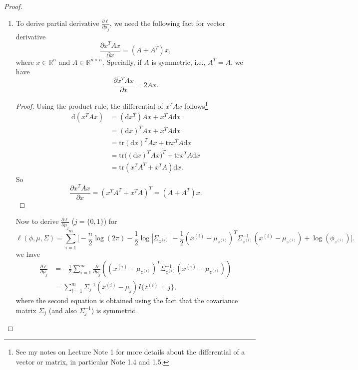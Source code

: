 \documentclass{article}
\begin{document}
\begin{proof}
\begin{enumerate}
            \item To derive partial derivative $\frac{\partial{\ell}}{\partial{\mu_j}}$, we need the following fact for vector derivative
                \[
                \frac{\partial{x^TAx}}{\partial{x}}=(A+A^T)x,
                \]
                where $x\in\mathbb{R}^n$ and $A\in{\mathbb{R}^{n\times{n}}}$. Specially, if $A$ is symmetric, i.e., $A^T=A$, we have
                \[\frac{\partial{x^TAx}}{\partial{x}}=2Ax.
                \]
                \begin{proof}
                Using the product rule, the differential of $x^TAx$ follows\footnote{See my notes on Lecture Note 1 for more details about the differential of a vector or matrix, in particular Note 1.4 and 1.5.}
                \[
                \begin{split}
                \text{d}(x^TAx)
                &=(\text{d}x^T)Ax+x^TA\text{d}x\\
                &=(\text{d}x)^TAx+x^TA\text{d}x\\
                &=\text{tr}(\text{d}x)^TAx+\text{tr}x^TA\text{d}x\\
                &=\text{tr}\big((\text{d}x)^TAx\big)^T+\text{tr}x^TA\text{d}x\\
                &=\text{tr}(x^TA^T+x^TA)\text{d}x.
                \end{split}
                \]
                So
                \[
                \frac{\partial{x^TAx}}{\partial{x}}=(x^TA^T+x^TA)^T=(A+A^T)x.
                \]
                \end{proof}
                Now to derive $\frac{\partial{\ell}}{\partial{\mu_j}}$ ($j=\{0,1\}$) for
                \[
                \ell(\phi,\mu,\Sigma)=\sum_{i=1}^m\Bigg[-\frac{n}{2}\log(2\pi)-\frac{1}{2}\log|\Sigma_{z^{(i)}}|%
                -\frac{1}{2}(x^{(i)}-\mu_{z^{(i)}})^T\Sigma_{z^{(i)}}^{-1}(x^{(i)}-\mu_{z^{(i)}})%
                +\log(\phi_{z^{(i)}})\Bigg].
                \]
                we have
                \[
                \begin{split}
                \frac{\partial{\ell}}{\partial{\mu_j}}
                &=-\frac{1}{2}\sum_{i=1}^m%
                \frac{\partial}{\partial{\mu_j}}\left((x^{(i)}-\mu_{z^{(i)}})^T\Sigma_{z^{(i)}}^{-1}(x^{(i)}-\mu_{z^{(i)}})\right)\\
                &=\sum_{i=1}^m \Sigma_j^{-1}(x^{(i)}-\mu_j)I\{z^{(i)}=j\},
                \end{split}
                \]
                where the second equation is obtained using the fact that the covariance matrix $\Sigma_j$ (and also $\Sigma_j^{-1}$) is symmetric.


\end{enumerate}
\end{proof}
\end{document}
